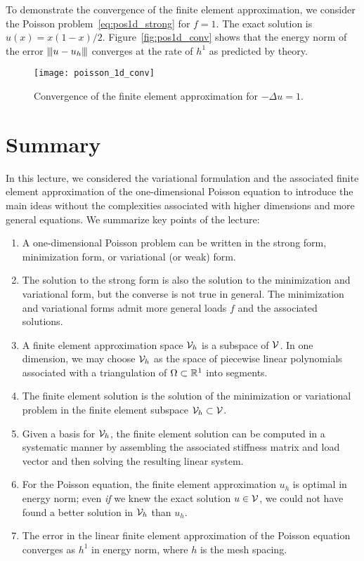 To demonstrate the convergence of the finite element approximation, we consider the Poisson problem~\eqref{eq:pos1d_strong} for $f = 1$. The exact solution is $u(x) = x(1-x)/2$. Figure~\eqref{fig:pos1d_conv} shows that the energy norm of the error $|\kern-1pt|\kern-1pt| u - u_h |\kern-1pt|\kern-1pt|$ converges at the rate of $h^1$ as predicted by theory.
\begin{figure}
  \centering
  \texttt{[image: poisson\_1d\_conv]}
  \caption{Convergence of the finite element approximation for $-\Delta u = 1$.}
  \label{fig:pos1d_conv}
\end{figure}

\section{Summary}
In this lecture, we considered the variational formulation and the associated finite element approximation of the one-dimensional Poisson equation to introduce the main ideas without the complexities associated with higher dimensions and more general equations.  We summarize key points of the lecture:
\begin{enumerate}
\item A one-dimensional Poisson problem can be written in the strong form, minimization form, or variational (or weak) form. 
\item The solution to the strong form is also the solution to the minimization and variational form, but the converse is not true in general.  The minimization and variational forms admit more general loads $f$ and the associated solutions.
\item A finite element approximation space $\mathcal{V}_h$ is a subspace of $\mathcal{V}$.  In one dimension, we may choose $\mathcal{V}_h$ as the space of piecewise linear polynomials associated with a triangulation of $\Omega \subset \mathbb{R}^1$ into segments.
\item The finite element solution is the solution of the minimization or variational problem in the finite element subspace $\mathcal{V}_h \subset \mathcal{V}$.
\item Given a basis for $\mathcal{V}_h$, the finite element solution can be computed in a systematic manner by assembling the associated stiffness matrix and load vector and then solving the resulting linear system.
\item For the Poisson equation, the finite element approximation $u_h$ is optimal in energy norm; even \emph{if} we knew the exact solution $u \in \mathcal{V}$, we could not have found a better solution in $\mathcal{V}_h$ than $u_h$.
\item The error in the linear finite element approximation of the Poisson equation converges as $h^1$ in energy norm, where $h$ is the mesh spacing.
\end{enumerate}
